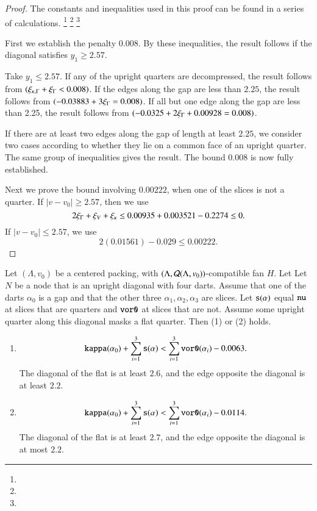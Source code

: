 \begin{proof}
The constants and inequalities used in this proof can be found in
a series of calculations.%
\footnote{} %
\footnote{} %
\footnote{} %


First we establish the penalty $0.008$.   
By these inequalities, the result follows
if the diagonal satisfies $y_1\ge 2.57$.

Take $y_1\le 2.57$. If any of the upright quarters are decompressed, 
the result follows from $(\xi_{\kappa,\Gamma}+\xi_\Gamma<0.008)$. If the edges
along the gap are less than $2.25$, the result follows from
$(-0.03883+3\xi_\Gamma = 0.008)$. If all but one edge along the
gap are  less than 2.25, the result follows from $(-0.0325 + 2\xi_\Gamma
+ 0.00928 = 0.008)$.

If there are at least two edges along the gap of length at
least $2.25$, we consider two cases according to whether they lie
on a common face of an upright quarter.  The same group of
inequalities gives the result. The bound $0.008$ is now fully
established.

\smallskip
Next we prove the bound involving $0.00222$, when one
of the slices is not a quarter.  If $|v-v_0|\ge2.57$, then
we use
    $$2\xi_\Gamma + \xi_V + \xi_\kappa \le 0.00935+0.003521 -0.2274\le 0.$$
If $|v-v_0|\le2.57$, we use
    $$2(0.01561)-0.029 \le 0.00222.$$
\end{proof}


\begin{lemma}
Let $(\Lambda,v_0)$ be a centered packing, 
with $(\Lambda,{\mathcal Q}(\Lambda,v_0))$-compatible fan $H$.
Let
Let $N$ be a node that is an upright diagonal with four darts.  
Assume that one of the darts $\alpha_0$ is a gap and that the other
three $\alpha_1,\alpha_2,\alpha_3$ are slices.  
Let 
${\operatorname{{\texttt{s}}}}(\alpha)$ equal ${\operatorname{{\texttt{nu}}}}$ at slices that
are quarters and ${\operatorname{{\texttt{vor0}}}}$ at slices that are not.
Assume 
some upright quarter along this diagonal masks a flat quarter.
Then (1) or (2) holds.
   \begin{enumerate}
    \item 
  $$
  {\operatorname{{\texttt{kappa}}}}(\alpha_0) + \sum_{i=1}^3 {\operatorname{{\texttt{s}}}}(\alpha) <
  \sum_{i=1}^3 {\operatorname{{\texttt{vor0}}}}(\alpha_i) -0.0063.
  $$
  The diagonal of the flat is at least $2.6$, and the edge
    opposite the diagonal is at least $2.2$.
    \item 
    $$
  {\operatorname{{\texttt{kappa}}}}(\alpha_0) + \sum_{i=1}^3 {\operatorname{{\texttt{s}}}}(\alpha) <
  \sum_{i=1}^3 {\operatorname{{\texttt{vor0}}}}(\alpha_i) -0.0114.
  $$
   The diagonal of the flat is at least $2.7$, and the edge
    opposite the diagonal is at most $2.2$.
    \end{enumerate}
\end{lemma}



